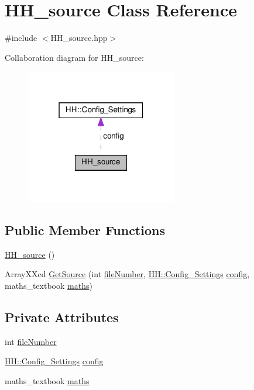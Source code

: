 \hypertarget{class_h_h__source}{}\section{H\+H\+\_\+source Class Reference}
\label{class_h_h__source}


{\ttfamily \#include $<$H\+H\+\_\+source.\+hpp$>$}



Collaboration diagram for H\+H\+\_\+source\+:\nopagebreak
\begin{figure}[H]
\begin{center}
\leavevmode
\includegraphics[width=187pt]{class_h_h__source__coll__graph}
\end{center}
\end{figure}
\subsection*{Public Member Functions}
\begin{DoxyCompactItemize}
\item 
\hyperlink{class_h_h__source_a0b3c052d274495b4f90fb09d15fff9fa}{H\+H\+\_\+source} ()
\item 
Array\+X\+Xcd \hyperlink{class_h_h__source_a059c934be1aaa0ed411fea5374bb2428}{Get\+Source} (int \hyperlink{class_h_h__source_a6631481cc1bea05ab564cb1841644a12}{file\+Number}, \hyperlink{class_h_h_1_1_config___settings}{H\+H\+::\+Config\+\_\+\+Settings} \hyperlink{class_h_h__source_adbab95c09c583e2aeebbb4679e6998e8}{config}, maths\+\_\+textbook \hyperlink{class_h_h__source_a93637ad30af846dd04eb741437114f8f}{maths})
\end{DoxyCompactItemize}
\subsection*{Private Attributes}
\begin{DoxyCompactItemize}
\item 
int \hyperlink{class_h_h__source_a6631481cc1bea05ab564cb1841644a12}{file\+Number}
\item 
\hyperlink{class_h_h_1_1_config___settings}{H\+H\+::\+Config\+\_\+\+Settings} \hyperlink{class_h_h__source_adbab95c09c583e2aeebbb4679e6998e8}{config}
\item 
maths\+\_\+textbook \hyperlink{class_h_h__source_a93637ad30af846dd04eb741437114f8f}{maths}
\end{DoxyCompactItemize}


